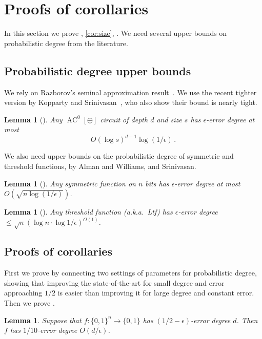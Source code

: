 \documentclass{toc}
\newtheorem{lem}[theorem]{Lemma}  %
\DeclareMathOperator{\AC}{\mathrm{AC}}  %
\newcommand{\zo}{\{0, 1\}}
\newcommand{\e}{\epsilon}
\begin{document}
\section{Proofs of corollaries \label{sec:Proofs-of-corollaries}}

In this section we prove , \ref{cor:size},
.  %
We need several upper bounds on probabilistic
degree from the literature.

\subsection{Probabilistic degree upper bounds}

We rely on Razborov's seminal approximation result~\cite{Raz87}.
We use the recent tighter version by
Kopparty and Srinivasan~\cite{DBLP:journals/toc/Kopparty018},
who also show their bound is nearly tight.
\begin{lem}[{\cite{DBLP:journals/toc/Kopparty018}}]
 \label{lem:approx-KS}Any $\AC^{0}[\oplus]$
circuit of depth $d$ and size $s$ has $\e$-error degree
%
%
at most
\[ O(\log s)^{d-1}\log(1/\e)\,. \]  %
\end{lem}

We also need upper bounds on the probabilistic degree of symmetric
and threshold functions, by Alman and Williams, and Srinivasan.
\begin{lem}[{\cite[Theorem 1.2]{DBLP:conf/focs/AlmanW15}}]\label{lem:AW-maj}
Any symmetric function on $n$ bits has $\e$-error
%
%
%
degree
at most  %
%
$O(\sqrt{n\log(1/\e)})$.
\end{lem}


\begin{lem}[{\cite[Theorem 12]{DBLP:conf/fsttcs/Srinivasan13}}]
\label{lem:Sri-LTF}
Any threshold function (a.k.a.~Ltf)
has $\e$-error degree $\le\sqrt{n}(\log n\cdot\log1/\e)^{O(1)}$.
\end{lem}


\subsection{Proofs of corollaries}

First we prove  by connecting two settings
of parameters for probabilistic degree, showing that improving the
state-of-the-art for small degree and error approaching $1/2$ is
easier than improving it for large degree and constant error. Then
we prove .
\begin{lem}
\label{lem:connection-tradeoff}Suppose that $f:\zo^{n}\to\zo$ has
$(1/2-\e)$-error degree $d$. Then $f$ has $1/10$-error degree
$O(d/\e)$.
\end{lem}
\end{document}
